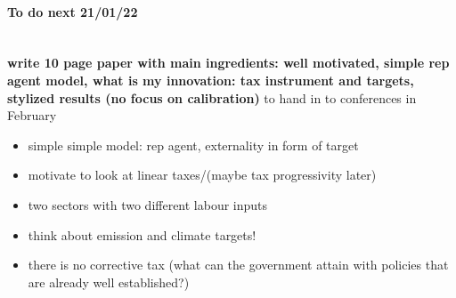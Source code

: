 \paragraph{To do next 21/01/22}
\ \\
\textbf{write 10 page paper with main ingredients: well motivated, simple rep agent model, what is my innovation: tax instrument and targets, stylized results (no focus on calibration)} \ar to hand in to conferences in February
\begin{itemize}
	\item simple simple model: rep agent, externality in form of target
	\item motivate to look at linear taxes/(maybe tax progressivity later)
	\item two sectors with two different labour inputs
	\item think about emission and climate targets! 
	\item there is no corrective tax (what can the government attain with policies that are already well established?)
\end{itemize}
